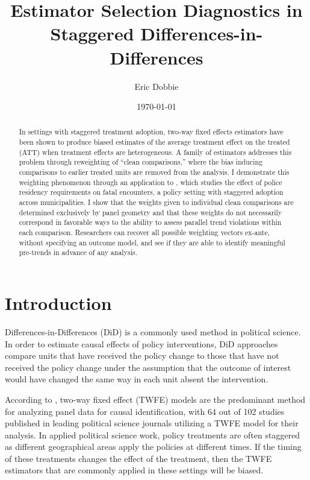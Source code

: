 \documentclass[12pt]{article}
\title{Estimator Selection Diagnostics in Staggered Differences-in-Differences}
\author{Eric Dobbie}
\date{\today}
\begin{document}
\maketitle

\begin{abstract}
    \noindent In settings with staggered treatment adoption, two-way fixed effects estimators have been shown to produce biased estimates of the average treatment effect on the treated (ATT) when treatment effects are heterogeneous. A family of estimators addresses this problem through reweighting of ``clean comparisons,'' where the bias inducing comparisons to earlier treated units are removed from the analysis. I demonstrate this weighting phenomenon through an application to \textcite{payson2025residency}, which studies the effect of police residency requirements on fatal encounters, a policy setting with staggered adoption across municipalities. I show that the weights given to individual clean comparisons are determined exclusively by panel geometry and that these weights do not necessarily correspond in favorable ways to the ability to assess parallel trend violations within each comparison. Researchers can recover all possible weighting vectors ex-ante, without specifying an outcome model, and see if they are able to identify meaningful pre-trends in advance of any analysis.
\end{abstract}

\newpage

\section{Introduction}

Differences-in-Differences (DiD) is a commonly used method in political science. In order to estimate causal effects of policy interventions, DiD approaches compare units that have received the policy change to those that have not received the policy change under the assumption that the outcome of interest would have changed the same way in each unit absent the intervention.

According to \textcite{chiu2026causal}, two-way fixed effect (TWFE) models are the predominant method for analyzing panel data for causal identification, with 64 out of 102 studies published in leading political science journals utilizing a TWFE model for their analysis. In applied political science work, policy treatments are often staggered as different geographical areas apply the policies at different times. If the timing of these treatments changes the effect of the treatment, then the TWFE estimators that are commonly applied in these settings will be biased. 
\end{document}
